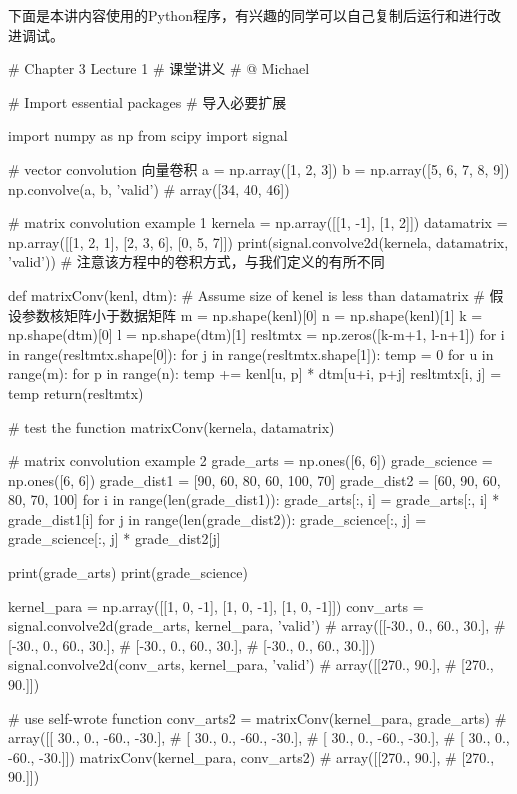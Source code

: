 \documentclass[12pt]{article}
\numberwithin{figure}{section}
\numberwithin{equation}{section}
\begin{document}
\noindent
下面是本讲内容使用的Python程序，有兴趣的同学可以自己复制后运行和进行改进调试。
\begin{python}
# Chapter 3 Lecture 1
# 课堂讲义
# @ Michael

# Import essential packages
# 导入必要扩展

import numpy as np
from scipy import signal

# vector convolution 向量卷积
a = np.array([1, 2, 3])
b = np.array([5, 6, 7, 8, 9])
np.convolve(a, b, 'valid')  # array([34, 40, 46])

# matrix convolution example 1
kernela = np.array([[1, -1], [1, 2]])
datamatrix = np.array([[1, 2, 1], [2, 3, 6], [0, 5, 7]])
print(signal.convolve2d(kernela, datamatrix, 'valid'))
# 注意该方程中的卷积方式，与我们定义的有所不同


def matrixConv(kenl, dtm):
    # Assume size of kenel is less than datamatrix
    # 假设参数核矩阵小于数据矩阵
    m = np.shape(kenl)[0]
    n = np.shape(kenl)[1]
    k = np.shape(dtm)[0]
    l = np.shape(dtm)[1]
    resltmtx = np.zeros([k-m+1, l-n+1])
    for i in range(resltmtx.shape[0]):
        for j in range(resltmtx.shape[1]):
            temp = 0
            for u in range(m):
                for p in range(n):
                    temp += kenl[u, p] * dtm[u+i, p+j]
                    resltmtx[i, j] = temp
    return(resltmtx)


# test the function
matrixConv(kernela, datamatrix)


# matrix convolution example 2
grade_arts = np.ones([6, 6])
grade_science = np.ones([6, 6])
grade_dist1 = [90, 60, 80, 60, 100, 70]
grade_dist2 = [60, 90, 60, 80, 70, 100]
for i in range(len(grade_dist1)):
    grade_arts[:, i] = grade_arts[:, i] * grade_dist1[i]
for j in range(len(grade_dist2)):
    grade_science[:, j] = grade_science[:, j] * grade_dist2[j]

print(grade_arts)
print(grade_science)

kernel_para = np.array([[1, 0, -1], [1, 0, -1], [1, 0, -1]])
conv_arts = signal.convolve2d(grade_arts, kernel_para, 'valid')
# array([[-30.,   0.,  60.,  30.],
#        [-30.,   0.,  60.,  30.],
#        [-30.,   0.,  60.,  30.],
#        [-30.,   0.,  60.,  30.]])
signal.convolve2d(conv_arts, kernel_para, 'valid')
# array([[270.,  90.],
#        [270.,  90.]])

# use self-wrote function
conv_arts2 = matrixConv(kernel_para, grade_arts)
# array([[ 30.,   0., -60., -30.],
#        [ 30.,   0., -60., -30.],
#        [ 30.,   0., -60., -30.],
#        [ 30.,   0., -60., -30.]])
matrixConv(kernel_para, conv_arts2)
# array([[270.,  90.],
#        [270.,  90.]])



\end{python}
\end{document}
